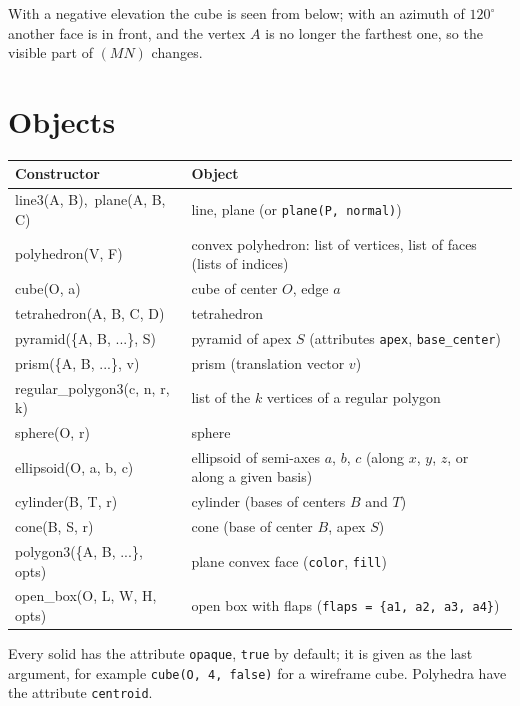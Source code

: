 \documentclass[11pt]{article}
\newcommand\code[1]{\texttt{#1}}
\begin{document}
With a negative elevation the cube is seen from below; with an azimuth of
$120^\circ$ another face is in front, and the vertex $A$ is no longer the
farthest one, so the visible part of $(MN)$ changes.

\section{Objects}

\begin{center}
\begin{tabular}{>{\ttfamily}l p{8.3cm}}
\toprule
\textrm{Constructor} & Object \\
\midrule
line3(A, B),\ plane(A, B, C) & line, plane (or \code{plane(P, normal)}) \\
polyhedron(V, F)  & convex polyhedron: list of vertices, list of faces
                    (lists of indices) \\
cube(O, a)        & cube of center $O$, edge $a$ \\
tetrahedron(A, B, C, D) & tetrahedron \\
pyramid(\{A, B, ...\}, S) & pyramid of apex $S$ (attributes \code{apex},
                    \code{base\_center}) \\
prism(\{A, B, ...\}, v) & prism (translation vector $v$) \\
regular\_polygon3(c, n, r, k) & list of the $k$ vertices of a regular polygon \\
sphere(O, r)      & sphere \\
ellipsoid(O, a, b, c) & ellipsoid of semi-axes $a$, $b$, $c$ (along
                    $x$, $y$, $z$, or along a given basis) \\
cylinder(B, T, r) & cylinder (bases of centers $B$ and $T$) \\
cone(B, S, r)     & cone (base of center $B$, apex $S$) \\
polygon3(\{A, B, ...\}, opts) & plane convex face (\code{color}, \code{fill}) \\
open\_box(O, L, W, H, opts) & open box with flaps (\code{flaps = \{a1, a2,
                    a3, a4\}}) \\
\bottomrule
\end{tabular}
\end{center}

Every solid has the attribute \code{opaque}, \code{true} by default; it is
given as the last argument, for example \code{cube(O, 4, false)} for a
wireframe cube. Polyhedra have the attribute \code{centroid}.
\end{document}
